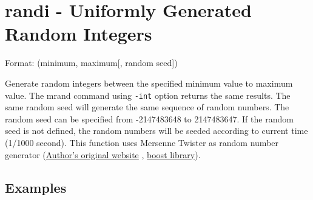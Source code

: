 
%

\section{randi - Uniformly Generated Random Integers\label{sect:randi}}

Format: (minimum, maximum[, random seed])

Generate random integers between the specified minimum value to maximum value.   The mrand command using \verb|-int| option returns the same results.
The same random seed will generate the same sequence of random numbers. The random seed can be specified from -2147483648 to 2147483647. If the random seed is not defined, the random numbers will be seeded according to current time (1/1000 second). 
This function uses Mersenne Twister as random number generator  (\href{http://www.math.sci.hiroshima-u.ac.jp/~m-mat/MT/emt.html}{Author’s original website}
, \href{http://www.boost.org/doc/libs/1_54_0/doc/html/boost_random.html}{boost library}).


\subsection*{Examples}


%

